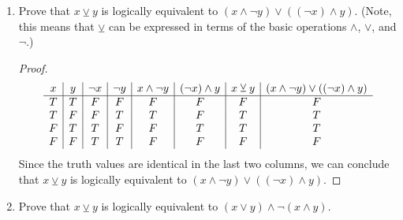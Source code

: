 \documentclass[12pt]{article}
\begin{document}
\begin{enumerate}
\begin{enumerate}
\begin{proof}
		\begin{displaymath}
			\begin{array}{c| c| c|c|c|c|c}
				x & y & z & x \veebar y & y \veebar z & (x \veebar y) \veebar z & x \veebar (y \veebar z) \\ %
				\hline  %
				T & T & T&F&F &T&T\\
				T & T & F &F &T&F&F\\
				T & F & T &T &T&F&F\\
				T & F & F &T &F&T&T\\
				F & T & T&T&F&F&F\\
				F & T & F &T&T&T&T\\
				F & F & T &F & T&T&T\\
				F & F & F &F &F&F&F\\
			\end{array}	
		\end{displaymath}
			Since the truth values are identical in $(x \veebar y) \veebar z$ and $x \veebar (y \veebar z)$, we can conclude that  $(x \veebar y) \veebar z = x \veebar (y \veebar z)$, which proves the associative property.
		\end{proof}
		
		\item Prove that $x \veebar y$ is logically equivalent to $(x \land \lnot y) \lor ((\lnot x)\land y)$. (Note, this means that $\veebar$ can be expressed in terms of the basic operations $\land$, $\lor$, and $\lnot$.) 
		
		\begin{proof}
				\begin{displaymath}
				\begin{array}{c| c| c|c|c|c|c|c}
					x & y & \lnot x&\lnot y &x \land \lnot y &(\lnot x)\land y & x \veebar y& (x \land \lnot y) \lor ((\lnot x)\land y)\\ 
					\hline  
					T & T & F &F&F&F&F&F\\
					T & F & F &T&T&F&T&T\\
					F & T & T &F&F&T&T&T\\
					F & F & T &T&F&F&F&F\\
				\end{array}	
			\end{displaymath}
		Since the truth values are identical in the last two columns, we can conclude that $x \veebar y$ is logically equivalent to $(x \land \lnot y) \lor ((\lnot x)\land y)$.  
		\end{proof}
		\item Prove that $x\veebar y$ is logically equivalent to $(x \lor y) \land \lnot (x\land y)$. 
		

\end{enumerate}
\end{enumerate}
\end{document}
